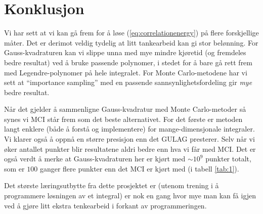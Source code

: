 \documentclass[11pt]{article}
\begin{document}
\section{Konklusjon}
Vi har sett at vi kan gå frem for å løse (\ref{eq:correlationenergy})
på flere forskjellige måter. Det er derimot veldig tydelig at litt
tankearbeid kan gi stor belønning. For Gauss-kvadraturen kan vi slippe
unna med mye mindre kjøretid (og fremdeles bedre resultat) ved å bruke
passende polynomer, i stedet for å bare gå rett frem med
Legendre-polynomer på hele integralet. For Monte Carlo-metodene har vi
sett at ``importance sampling'' med en passende
sannsynlighetsfordeling gir \textit{mye} bedre resultat. 

Når det gjelder å sammenligne Gauss-kvadratur med Monte Carlo-metoder
så synes vi MCI står frem som det beste alternativet. For det første
er metoden langt enklere (både å forstå og implementere) for
mange-dimensjonale integraler. Vi klarer også å oppnå en større presisjon enn det GULAG presterer. Selv
når vi øker antallet punkter blir resultatene aldri bedre enn hva vi
får med MCI. Det er også verdt å merke at Gauss-kvadraturen her er
kjørt med $\sim 10^9$ punkter totalt, som er $100$ ganger
flere punkter enn det MCI er kjørt med (i tabell \ref{tab:1}). 


Det største læringsutbytte fra dette prosjektet er (utenom trening i å
programmere løsningen av et integral) er nok en gang hvor mye man kan
få igjen ved å gjøre litt ekstra tenkearbeid i forkant av
programmeringen. 


\printbibliography
\end{document}
